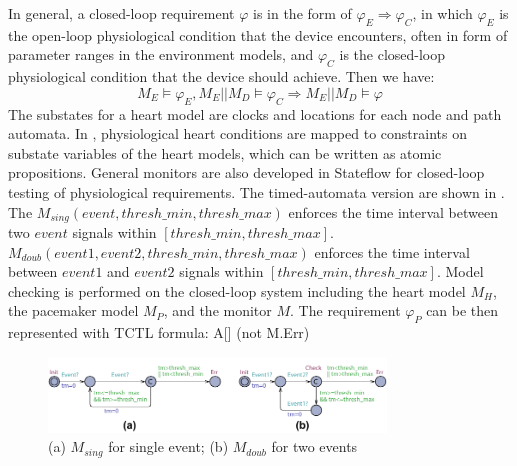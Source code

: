 In general, a closed-loop requirement $\varphi$ is in the form of $\varphi_E\Rightarrow \varphi_C$, in which $\varphi_E$ is the open-loop physiological condition that the device encounters, often in form of parameter ranges in the environment models, and $\varphi_C$ is the closed-loop physiological condition that the device should achieve. Then we have:
\begin{equation}\label{req_def}
M_E\models\varphi_E, M_E||M_D\models \varphi_C\Rightarrow M_E||M_D\models\varphi
\end{equation}
The substates for a heart model are clocks and locations for each node and path automata. In \cite{vhm_iccps11}, physiological heart conditions are mapped to constraints on substate variables of the heart models, which can be written as atomic propositions. General monitors are also developed in Stateflow \cite{stateflow} for closed-loop testing of physiological requirements. The timed-automata version are shown in . The $M_{sing}(event,thresh\_min, thresh\_max)$ enforces the time interval between two $event$ signals within $[thresh\_min,thresh\_max]$. \\
$M_{doub}(event1,event2,thresh\_min,thresh\_max)$ enforces the time interval between $event1$ and $event2$ signals within $[thresh\_min,thresh\_max]$. Model checking is performed on the closed-loop system including the heart model $M_H$, the pacemaker model $M_P$, and the monitor $M$. The requirement $\varphi_P$ can be then represented with TCTL formula:
 \textsf{A[] (not M.Err)}
\begin{figure}[!b]
		\centering
		\includegraphics[width=0.8\textwidth]{figs/monitor.pdf}
		\caption{\small (a) $M_{sing}$ for single event; (b) $M_{doub}$ for two events}
		\label{fig:monitor}
\end{figure}
%